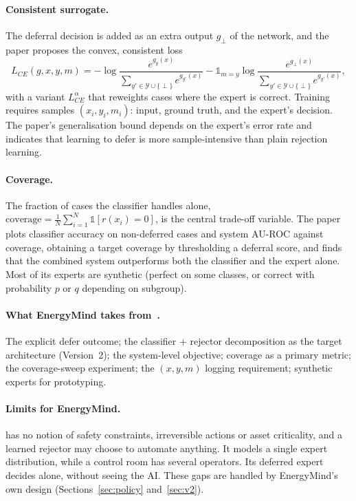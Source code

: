 \documentclass[11pt,a4paper]{article}
\renewcommand{\_}{\textunderscore\allowbreak}
\begin{document}
\paragraph{Consistent surrogate.} The deferral decision is added as an extra output $g_\perp$ of the network,
and the paper proposes the convex, consistent loss
\begin{equation}
L_{CE}(g,x,y,m)=-\log\frac{e^{g_y(x)}}{\sum_{y'\in\mathcal Y\cup\{\perp\}}e^{g_{y'}(x)}}
-\mathbb 1_{m=y}\log\frac{e^{g_\perp(x)}}{\sum_{y'\in\mathcal Y\cup\{\perp\}}e^{g_{y'}(x)}},
\end{equation}
with a variant $L^\alpha_{CE}$ that reweights cases where the expert is correct. Training requires samples
$(x_i,y_i,m_i)$: input, ground truth, and the expert's decision. The paper's generalisation bound depends on the
expert's error rate and indicates that learning to defer is more sample-intensive than plain rejection learning.

\paragraph{Coverage.} The fraction of cases the classifier handles alone,
$\mathrm{coverage}=\frac1N\sum_{i=1}^N\mathbb 1[r(x_i)=0]$, is the central trade-off variable. The paper plots
classifier accuracy on non-deferred cases and system AU-ROC against coverage, obtaining a target coverage by
thresholding a deferral score, and finds that the combined system outperforms both the classifier and the
expert alone. Most of its experts are synthetic (perfect on some classes, or correct with probability $p$ or
$q$ depending on subgroup).

\paragraph{What EnergyMind takes from~\cite{mozannar}.} The explicit defer outcome; the classifier + rejector
decomposition as the target architecture (Version~2); the system-level objective; coverage as a primary
metric; the coverage-sweep experiment; the $(x,y,m)$ logging requirement; synthetic experts for prototyping.

\paragraph{Limits for EnergyMind.} \cite{mozannar} has no notion of safety constraints, irreversible actions or
asset criticality, and a learned rejector may choose to automate anything. It models a single expert
distribution, while a control room has several operators. Its deferred expert decides alone, without seeing
the AI. These gaps are handled by EnergyMind's own design (Sections~\ref{sec:policy} and~\ref{sec:v2}).
\end{document}
